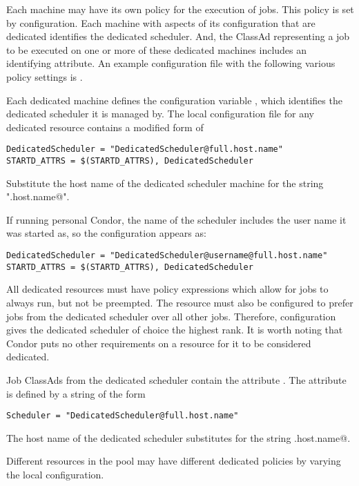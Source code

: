 Each machine may have its own policy for the execution of jobs.
This policy is set by configuration.
Each machine with aspects of its configuration that are dedicated
identifies the dedicated scheduler.
And, the ClassAd representing a job to be executed on
one or more of these dedicated machines includes an identifying attribute.
An example configuration file with the following various policy settings
is .

Each dedicated machine defines the configuration variable
, which identifies
the dedicated scheduler it is managed by.
The local configuration file for any dedicated resource contains
a modified form of

\begin{verbatim}
DedicatedScheduler = "DedicatedScheduler@full.host.name"
STARTD_ATTRS = $(STARTD_ATTRS), DedicatedScheduler
\end{verbatim}

Substitute the host name of the dedicated scheduler
machine for the string "\verb@full.host.name@". 

If running personal Condor, the name of the scheduler includes
the user name it was started as, so the configuration appears as:

\begin{verbatim}
DedicatedScheduler = "DedicatedScheduler@username@full.host.name"
STARTD_ATTRS = $(STARTD_ATTRS), DedicatedScheduler
\end{verbatim}

All dedicated resources must have policy expressions which allow for
jobs to always run, but not be preempted.
The resource must also be configured to prefer jobs from the dedicated 
scheduler over all other jobs.
Therefore, configuration gives
the dedicated scheduler of choice the highest rank.
It is worth noting that Condor puts no other requirements on a
resource for it to be considered dedicated.  

Job ClassAds from the dedicated scheduler 
contain the attribute .
The attribute is defined by a string of the form 
\begin{verbatim}
Scheduler = "DedicatedScheduler@full.host.name"
\end{verbatim}
The host name of the dedicated scheduler
substitutes for the string \verb@full.host.name@. 

Different resources in the pool may have different dedicated policies
by varying the local configuration.

